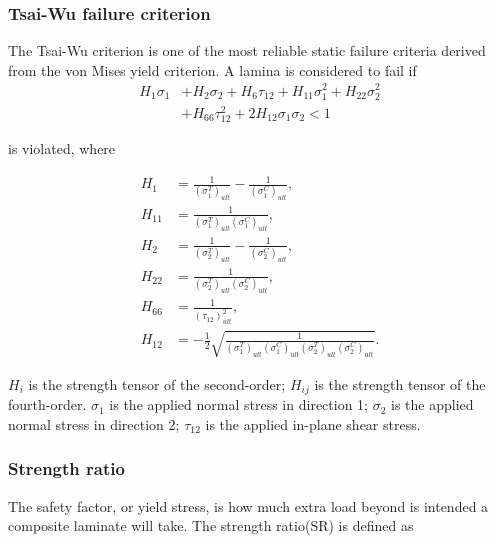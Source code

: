 \documentclass[letterpaper]{IEEEtran}
\begin{document}
\subsubsection{Tsai-Wu failure criterion}
The Tsai-Wu criterion is one of the most reliable static failure criteria derived from the von
Mises yield criterion.  
A lamina is considered to fail
if \begin{equation} \label{eq:tsai_wu}
\begin{split}
	H_1 \sigma_1  & + H_2 \sigma_2 + H_6 \tau_{12} + H_{11}\sigma_1^2 + H_{22} \sigma_2^2 \\
				  & + H_{66}  \tau_{12}^2 + 2H_{12}\sigma_1\sigma_2 < 1
\end{split}
\end{equation}

is violated, where

\begin{equation}
	\begin{split}
		H_{1}&=\frac{1}{\left(\sigma_{1}^{T}\right)_{u l t}}-\frac{1}{\left(\sigma_{1}^{C}\right)_{u l t}}\textstyle{,} \\
		H_{11}&=\frac{1}{\left(\sigma_{1}^{T}\right)_{u l t}\left(\sigma_{1}^{C}\right)_{u l t}} \textstyle{,}\\
		H_{2}&=\frac{1}{\left(\sigma_{2}^{T}\right)_{u l t}}-\frac{1}{\left(\sigma_{2}^{C}\right)_{u l t}} \textstyle{,}\\
		H_{22}&=\frac{1}{\left(\sigma_{2}^{T}\right)_{u l t}\left(\sigma_{2}^{C}\right)_{u l t}} \textstyle{,}\\
		H_{66}&=\frac{1}{\left(\tau_{12}\right)_{u l t}^{2}} \textstyle{,}\\
		H_{12}&=-\frac{1}{2} \sqrt{\frac{1}{\left(\sigma_{1}^{T}\right)_{u l
		t}\left(\sigma_{1}^{C}\right)_{u l t}\left(\sigma_{2}^{T}\right)_{u l
		t}\left(\sigma_{2}^{C}\right)_{u l t}}}\textstyle{.}
	\end{split}
\end{equation}

$H_i$ is the strength tensor of the second-order; $H_{ij}$ is the strength
tensor of the fourth-order. $\sigma_1$ is the applied normal stress in 
direction 1; $\sigma_2$ is the applied normal stress in direction 2; 
$\tau_{12}$ is the applied in-plane shear stress.




\subsubsection{Strength ratio}
The safety factor, or yield stress, is how much extra load beyond is intended a
composite laminate will take. The strength ratio(SR) is defined as 
\end{document}
